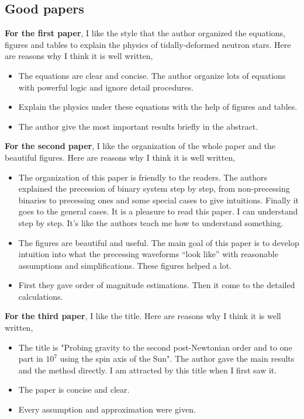 \documentclass[12pt]{article}
\begin{document}
\subsection{Good papers}
\textbf{For the first paper}, I like the style that the author organized the equations, figures and tables to explain the physics of tidally-deformed neutron stars. Here are reasons why I think it is well written,
\begin{itemize}
    \item The equations are clear and concise. The author organize lots of equations with powerful logic and ignore detail procedures.
    \item Explain the physics under these equations with the help of figures and tables. 
    \item The author give the most important results briefly in the abstract.
\end{itemize}
\textbf{For the second paper}, I like the organization of the whole paper and the beautiful figures. Here are reasons why I think it is well written,
\begin{itemize}
    \item The organization of this paper is friendly to the readers. The authors explained the precession of binary system step by step, from non-precessing binaries to precessing ones and some special cases to give intuitions. Finally it goes to the general cases. It is a pleasure to read this paper. I can understand step by step. It's like the authors teach me how to understand something.
    \item The figures are beautiful and useful. The main goal of this paper is to develop intuition into what the precessing waveforms “look like” with reasonable assumptions and simplifications. These figures helped a lot.
    \item First they gave order of magnitude estimations. Then it come to the detailed calculations.
\end{itemize}
\textbf{For the third paper}, I like the title. Here are reasons why I think it is well written,
\begin{itemize}
    \item The title is "Probing gravity to the second post-Newtonian order and to one part in $10^7$ using the spin axis of the Sun". The author gave the main results and the method directly. I am attracted by this title when I first saw it.
    \item The paper is concise and clear. 
    \item Every assumption and approximation were given.
\end{itemize}
\end{document}
